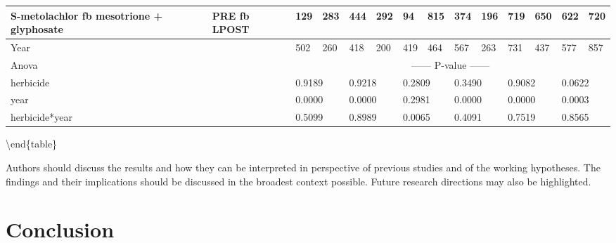 \documentclass[agriculture,article,submit,moreauthors,pdftex]{mdpi}
\begin{document}
{\begin{tabular}{llllllllllllll}
  S-metolachlor fb mesotrione + glyphosate & PRE fb LPOST & 129                & 283               & 444              & 292             & 94               & 815              & 374          & 196          & 719          & 650         & 622            & 720           \\ \hline
  Year                                     &              & 502                & 260               & 418              & 200             & 419              & 464              & 567          & 263          & 731          & 437         & 577            & 857           \\ \hline
  Anova                                    &              & \multicolumn{12}{c}{------ P-value ------}                                                                                                                                                                    \\ \cline{1-1}
  herbicide                                &              & \multicolumn{2}{l}{0.9189}             & \multicolumn{2}{l}{0.9218}         & \multicolumn{2}{l}{0.2809}          & \multicolumn{2}{l}{0.3490}  & \multicolumn{2}{l}{0.9082} & \multicolumn{2}{l}{0.0622}     \\
  year                                     &              & \multicolumn{2}{l}{0.0000}             & \multicolumn{2}{l}{0.0000}         & \multicolumn{2}{l}{0.2981}          & \multicolumn{2}{l}{0.0000}  & \multicolumn{2}{l}{0.0000} & \multicolumn{2}{l}{0.0003}     \\
  herbicide*year                           &              & \multicolumn{2}{l}{0.5099}             & \multicolumn{2}{l}{0.8989}         & \multicolumn{2}{l}{0.0065}          & \multicolumn{2}{l}{0.4091}  & \multicolumn{2}{l}{0.7519} & \multicolumn{2}{l}{0.8565}     \\ \hline
  \end{tabular}%
}

\textbackslash end\{table\}

Authors should discuss the results and how they can be interpreted in
perspective of previous studies and of the working hypotheses. The
findings and their implications should be discussed in the broadest
context possible. Future research directions may also be highlighted.

\hypertarget{conclusion}{%
\section{Conclusion}\label{conclusion}}
\end{document}
